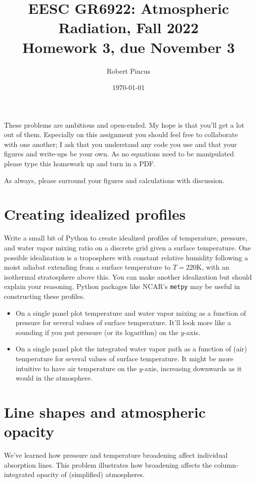\documentclass{article}
\title{EESC GR6922: Atmospheric Radiation, Fall 2022 \\  Homework 3, due November 3}
\author{Robert Pincus}
\date{\today}
\begin{document}
\maketitle
These problems are  ambitious and open-ended. My hope is that you'll get a lot out of them. Especially on this assignment you should feel free to collaborate with one another; I ask that you understand any code you use and that your figures and write-ups be your own. As no equations need to be manipulated please type this homework up and turn in a PDF. 

As always, please surround your figures and calculations with discussion. 

\section{Creating idealized profiles}

Write a small bit of Python to create idealized profiles of temperature, pressure, and water vapor mixing ratio on a discrete grid given a surface temperature. One possible idealization is a troposphere with constant relative humidity following a moist adiabat extending from a surface temperature to $T = 220 \si{\kelvin}$, with an isothermal stratosphere above this. You can make another idealization but should explain your reasoning. Python packages like NCAR's {\tt metpy} may be useful in constructing these profiles. 

\begin{itemize}
\item On a single panel plot temperature and water vapor mixing as a function of pressure for several values of surface temperature. It'll look more like a sounding if you put pressure (or its logarithm) on the $y$-axis. 
\item On a single panel plot the integrated water vapor path as a function of (air) temperature for several values of surface temperature. It might be more intuitive to have air temperature on the $y$-axis, increasing downwards as it would in the atmosphere. 
\end{itemize}

\section{Line shapes and atmospheric opacity}

We've learned how pressure and temperature broadening affect individual absorption lines. This problem illustrates how broadening affects the column-integrated opacity of (simplified) atmospheres. 
\end{document}
